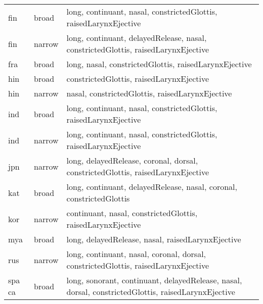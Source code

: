 {\begin{tabularx}{1.3\textwidth}{|llX|}
fin                & broad         & long, continuant, nasal, constrictedGlottis, raisedLarynxEjective                                                                  \\
fin                & narrow        & long, continuant, delayedRelease, nasal, constrictedGlottis, raisedLarynxEjective                                                  \\
fra                & broad         & long, nasal, constrictedGlottis, raisedLarynxEjective                                                                              \\
hin                & broad         & constrictedGlottis, raisedLarynxEjective                                                                                           \\
hin                & narrow        & nasal, constrictedGlottis, raisedLarynxEjective                                                                                    \\
ind                & broad         & long, continuant, nasal, constrictedGlottis, raisedLarynxEjective                                                                  \\
ind                & narrow        & long, continuant, nasal, constrictedGlottis, raisedLarynxEjective                                                                  \\
jpn                & narrow        & long, delayedRelease, coronal, dorsal, constrictedGlottis, raisedLarynxEjective                                                    \\
kat                & broad    & long, continuant, delayedRelease, nasal, coronal, constrictedGlottis                                                               \\
kor                & narrow        & continuant, nasal, constrictedGlottis, raisedLarynxEjective                                                                        \\
mya                & broad    & long, delayedRelease, nasal, raisedLarynxEjective                                                                                  \\
rus                & narrow        & long, continuant, nasal, coronal, dorsal, constrictedGlottis, raisedLarynxEjective                                                 \\
spa ca             & broad         & long, sonorant, continuant, delayedRelease, nasal, dorsal, constrictedGlottis, raisedLarynxEjective                                \\

\end{tabularx}}
